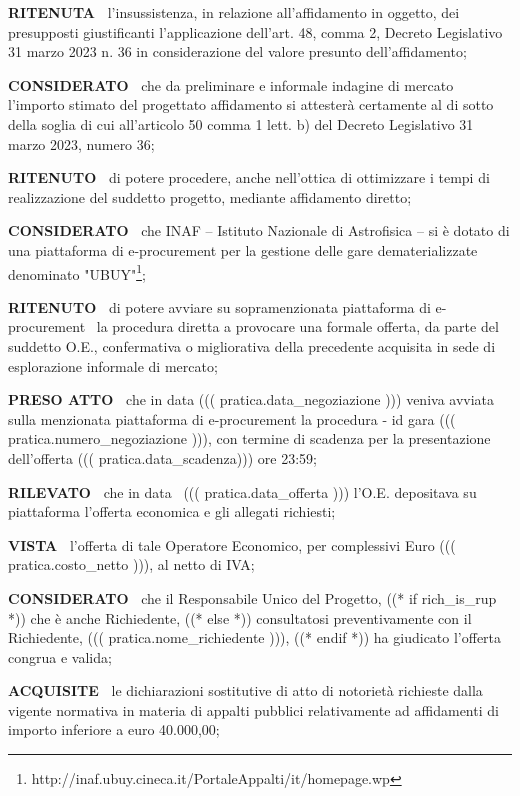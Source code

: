 \textbf{RITENUTA~}  l'insussistenza, in relazione
all'affidamento in oggetto, dei presupposti giustificanti
l'applicazione dell'art. 48, comma 2, Decreto Legislativo 31 marzo
2023 n. 36  in considerazione del valore presunto dell'affidamento; 

\textbf{CONSIDERATO~} che da preliminare e informale indagine
di mercato l'importo stimato del progettato affidamento si attesterà
certamente al di sotto della soglia di cui all'articolo 50 comma 1
lett. b) del Decreto Legislativo 31 marzo 2023, numero 36;

\textbf{RITENUTO~} di potere procedere, anche nell'ottica di
ottimizzare i tempi di realizzazione del suddetto progetto, mediante
affidamento diretto;

\textbf{CONSIDERATO~}  che INAF – Istituto Nazionale di
Astrofisica – si è dotato di una piattaforma di e-procurement
per la gestione delle gare dematerializzate denominato
"UBUY"\footnote{http://inaf.ubuy.cineca.it/PortaleAppalti/it/homepage.wp};

\textbf{RITENUTO~} di potere avviare su sopramenzionata piattaforma di
 e-procurement  la procedura diretta a provocare una formale offerta,
 da parte del suddetto O.E., confermativa o migliorativa della precedente
 acquisita in sede di esplorazione informale di mercato;

\textbf{PRESO ATTO~} che in data ((( pratica.data_negoziazione ))) veniva
 avviata sulla menzionata piattaforma di e-procurement la procedura -
 id gara ((( pratica.numero_negoziazione ))), con termine di
scadenza per la presentazione dell'offerta ((( pratica.data_scadenza))) ore 23:59;


\textbf{RILEVATO~} che in data  ((( pratica.data_offerta )))
l'O.E. depositava su piattaforma l'offerta economica e gli allegati richiesti;

\textbf{VISTA~} l'offerta di tale Operatore Economico, per complessivi Euro ((( pratica.costo_netto ))),
al netto di IVA;

\textbf{CONSIDERATO~} che il Responsabile Unico del Progetto, %
((* if rich_is_rup *)) che è anche Richiedente, ((* else *)) %
consultatosi preventivamente con il Richiedente, ((( pratica.nome_richiedente ))), %
((* endif *)) %
ha giudicato l'offerta congrua e valida;

\textbf{ACQUISITE~}   le dichiarazioni sostitutive
di atto di notorietà richieste dalla vigente normativa in materia di
appalti pubblici relativamente ad affidamenti di importo inferiore a
euro 40.000,00;

